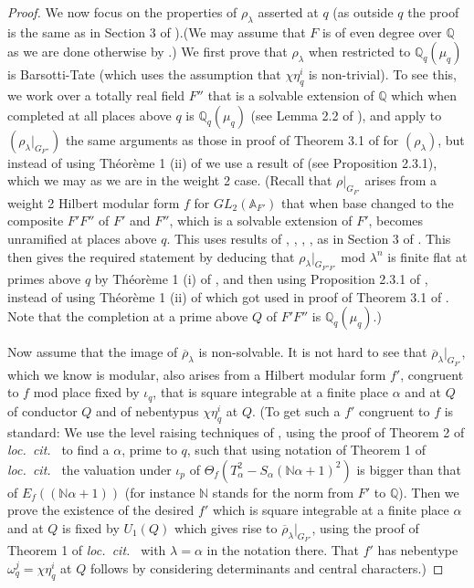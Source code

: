 \documentclass[12pt]{amsart}
\newcommand{\N}{\mathbb{N}}
\newcommand{\A}{\mathbb{A}}
\newcommand{\Q}{\mathbb{Q}}
\begin{document}
\begin{proof}
We now focus on the properties of $\rho_{\lambda}$ asserted at $q$
(as outside $q$ the proof is the same as in Section 3 of \cite{KW}).(We may assume that $F$ is of even degree over $\Q$ as we are done otherwise by \cite{Saito}.) We first prove that $\rho_\lambda$ when restricted to
$\Q_q(\mu_q)$ is Barsotti-Tate (which uses the assumption
that $\chi\eta_q^i$ is non-trivial). To see this, we work over a totally real field 
$F''$ that is a solvable extension of $\Q$ which when completed at all 
places above $q$ is $\Q_q(\mu_q)$ (see Lemma 2.2 of \cite{Tay3}), 
and apply to $(\rho_\lambda|_{G_{F''}})$ the same arguments as those in proof of Theorem 3.1 of \cite{KW} for $(\rho_\lambda)$, but instead of using 
Th\'eor\`eme 1 (ii) of  \cite{Breuil-cong} we use 
a result of \cite{Raynaud} (see Proposition 2.3.1), which we may 
as we are in the weight 2 case. 
({\small Recall that $\rho|_{G_{F'}}$ arises from a weight 2 Hilbert modular form $f$ for $GL_2(\A_{F'})$ that when base changed to the composite $F'F''$ of $F'$ and $F''$, which is a solvable extension of $F'$, becomes
unramified at places above $q$. This uses results of \cite{Tay1}, \cite{Tay2}, 
\cite{Carayol}, \cite{Tay}, \cite{AC} as in Section 3 of \cite{KW}.
This then gives the required statement by deducing that 
$\rho_{\lambda}|_{G_{F''F'}}$ mod $\lambda^n$ is finite flat at primes above $q$ by Th\'eor\`eme 1 (i) of \cite{Breuil-cong},
and then using  Proposition 2.3.1 of \cite{Raynaud}, instead of using Th\'eor\`eme 1 (ii) of \cite{Breuil-cong} which got used in proof of Theorem 3.1 of \cite{KW}. Note that the completion at a prime above $Q$ of $F'F''$ is $\Q_q(\mu_q)$.}) 

Now assume that the image of $\overline \rho_\lambda$ is non-solvable.
It is not hard to see that 
${\overline \rho_\lambda}|_{G_{F'}}$, which we know is modular, also arises from  a Hilbert modular 
form $f'$, congruent to $f$ mod place fixed by $\iota_q$, that is square integrable at a finite place $\alpha$ and at $Q$ of conductor $Q$ and of nebentypus $\chi\eta_q^i$ at $Q$. 
({\small To get such a $f'$ congruent to $f$ is standard: 
We use the level raising techniques of \cite{Tay}, using the proof of Theorem 2 of {\it loc.\ cit.\ } to find a 
$\alpha$, prime to $q$,  such that using notation of Theorem 1 of {\it loc.\ cit.\ } the valuation under $\iota_p$ of $\Theta_f(T_{\alpha}^2-S_{\alpha}(\N \alpha +1)^2)$
is bigger than that of $E_f((\N \alpha +1))$ (for instance $\N$ stands for the norm from $F'$ to $\Q$). Then we prove the existence of the desired $f'$ which is square integrable at a finite place $\alpha$ and at $Q$ is fixed by $U_1(Q)$ which gives rise to ${\overline \rho_\lambda}|_{G_{F'}}$, using  the proof of Theorem 1 of {\it loc.\ cit.\ } with $\lambda=\alpha$ in the notation there.
That $f'$ has nebentype $\omega_q^j=\chi\eta_q^i$ at $Q$ follows by considering determinants and central characters.})


\end{proof}
\end{document}

